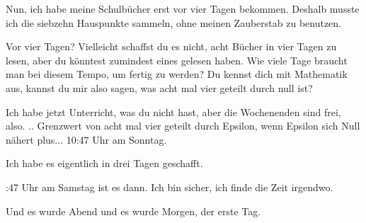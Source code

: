 \glqq Nun, ich habe meine Schulbücher erst vor vier Tagen bekommen. Deshalb
musste ich die siebzehn Hauspunkte sammeln, ohne meinen Zauberstab zu
benutzen.\grqq{}

\glqq Vor vier Tagen? Vielleicht schaffst du es nicht, acht Bücher in vier Tagen
zu lesen, aber du könntest zumindest eines gelesen haben. Wie viele Tage braucht
man bei diesem Tempo, um fertig zu werden? Du kennst dich mit Mathematik aus,
kannst du mir also sagen, was acht mal vier geteilt durch null ist?\grqq{}

\glqq Ich habe jetzt Unterricht, was du nicht hast, aber die Wochenenden sind
frei, also. .. Grenzwert von acht mal vier geteilt durch Epsilon, wenn Epsilon
sich Null nähert plus... 10:47 Uhr am Sonntag.\grqq{}

\glqq Ich habe es eigentlich in drei Tagen geschafft.\grqq{}

:47 Uhr am Samstag ist es dann. Ich bin sicher, ich finde die Zeit
irgendwo.\grqq{}

Und es wurde Abend und es wurde Morgen, der erste Tag.